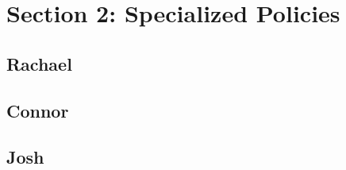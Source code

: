 \documentclass[12pt]{article}
\begin{document}
	
	
\newpage
\section{Section 2: Specialized Policies}
\subsection{Rachael}


\newpage

\subsection{Connor}



\newpage

\subsection{Josh}



\newpage

	
\end{document}
